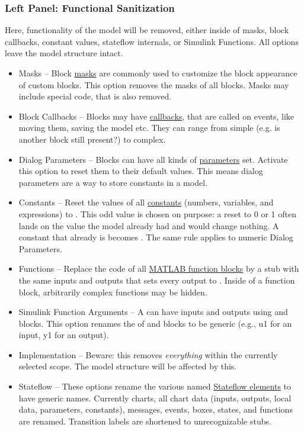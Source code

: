 \documentclass{article}
\begin{document}
\subsubsection{Left Panel: Functional Sanitization}
\label{lbl:leftside}
Here, functionality of the model will be removed, either inside of masks, block callbacks, constant values, stateflow internals, or Simulink Functions. All options leave the model structure intact.
\begin{itemize}
	\item Masks -- Block \href{https://www.mathworks.com/help/simulink/ug/block-masks.html}{masks} are commonly used to customize the block appearance of custom blocks. This option removes the masks of all blocks. Masks may include special code, that is also removed.
	\item Block Callbacks -- Blocks may have \href{https://www.mathworks.com/help/simulink/ug/block-callbacks.html}{callbacks}, that are called on events, like moving them, saving the model etc. They can range from simple (e.g. is another block still present?) to complex.
	\item Dialog Parameters -- Blocks can have all kinds of \href{https://www.mathworks.com/help/simulink/slref/block-specific-parameters.html}{parameters} set. Activate this option to reset them to their default values. This means dialog parameters are a way to store constants in a model.
	\item Constants -- Reset the values of all \href{https://www.mathworks.com/help/simulink/slref/constant.html}{constants} (numbers, variables, and expressions) to . This odd value is chosen on purpose: a reset to 0 or 1 often lands on the value the model already had and would change nothing. A constant that already is  becomes . The same rule applies to numeric Dialog Parameters.
	\item Functions -- Replace the code of all \href{https://www.mathworks.com/help/simulink/ug/what-is-a-matlab-function-block.html}{MATLAB function blocks} by a stub with the same inputs and outputs that sets every output to . Inside of a function block, arbitrarily complex functions may be hidden.
	\item Simulink Function Arguments -- A \simfunc can have inputs and outputs using \argin and \argout blocks. This option renames the  of \argin and \argout blocks to be generic (e.g., u1 for an input, y1 for an output).
	\item Implementation -- Beware: this removes \textit{everything} within the currently selected scope. The model structure will be affected by this.
	
	\item Stateflow -- These options rename the various named \href{https://www.mathworks.com/help/stateflow/ug/overview-of-stateflow-objects.html}{Stateflow elements} to have generic names. Currently charts, all chart data (inputs, outputs, local data, parameters, constants), messages, events, boxes, states, and functions are renamed. Transition labels are shortened to unrecognizable stubs.
\end{itemize}
\end{document}
